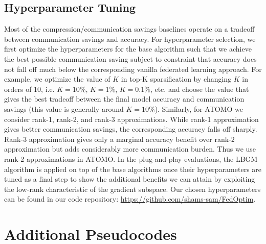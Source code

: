 \subsection{Hyperparameter Tuning}
\label{app:hyperparams}

Most of the compression/communication savings baselines operate on a tradeoff between communication savings and accuracy. For hyperparameter selection, we first optimize the hyperparameters for the base algorithm such that we achieve the best possible communication saving subject to constraint that accuracy does not fall off much below the corresponding vanilla federated learning approach. For example, we optimize the value of $K$ in top-K sparsification by changing $K$ in orders of 10, i.e. $K=10\%$, $K=1\%$, $K=0.1\%$, etc. and choose the value that gives the best tradeoff between the final model accuracy and communication savings (this value is generally around $K=10\%$). Similarly, for ATOMO we consider rank-1, rank-2, and rank-3 approximations. While rank-1 approximation gives better communication savings, the corresponding accuracy falls off sharply. Rank-3 approximation gives only a marginal accuracy benefit over rank-2 approximation but adds considerably more communication burden. Thus we use rank-2 approximations in ATOMO. In the plug-and-play evaluations, the LBGM algorithm is applied on top of the base algorithms once their hyperparameters are tuned as a final step to show the additional benefits we can attain by exploiting the low-rank characteristic of the  gradient subspace. Our chosen hyperparameters can be found in our code repository: \url{https://github.com/shams-sam/FedOptim}.


\section{Additional Pseudocodes}

